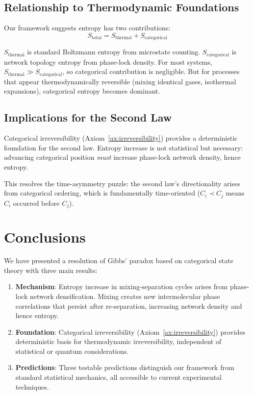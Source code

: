 \documentclass[twocolumn,superscriptaddress,prb,10pt]{revtex4-2}
\theoremstyle{definition}
\theoremstyle{remark}
\begin{document}
\subsection{Relationship to Thermodynamic Foundations}

Our framework suggests entropy has two contributions:
\begin{equation}
S_{\text{total}} = S_{\text{thermal}} + S_{\text{categorical}}
\end{equation}

$S_{\text{thermal}}$ is standard Boltzmann entropy from microstate counting. $S_{\text{categorical}}$ is network topology entropy from phase-lock density. For most systems, $S_{\text{thermal}} \gg S_{\text{categorical}}$, so categorical contribution is negligible. But for processes that appear thermodynamically reversible (mixing identical gases, isothermal expansions), categorical entropy becomes dominant.

\subsection{Implications for the Second Law}

Categorical irreversibility (Axiom~\ref{ax:irreversibility}) provides a deterministic foundation for the second law. Entropy increase is not statistical but necessary: advancing categorical position \emph{must} increase phase-lock network density, hence entropy.

This resolves the time-asymmetry puzzle: the second law's directionality arises from categorical ordering, which is fundamentally time-oriented ($C_i \prec C_j$ means $C_i$ occurred before $C_j$).

\section{Conclusions}

We have presented a resolution of Gibbs' paradox based on categorical state theory with three main results:

\begin{enumerate}
\item \textbf{Mechanism}: Entropy increase in mixing-separation cycles arises from phase-lock network densification. Mixing creates new intermolecular phase correlations that persist after re-separation, increasing network density and hence entropy.

\item \textbf{Foundation}: Categorical irreversibility (Axiom~\ref{ax:irreversibility}) provides deterministic basis for thermodynamic irreversibility, independent of statistical or quantum considerations.

\item \textbf{Predictions}: Three testable predictions distinguish our framework from standard statistical mechanics, all accessible to current experimental techniques.
\end{enumerate}
\end{document}
